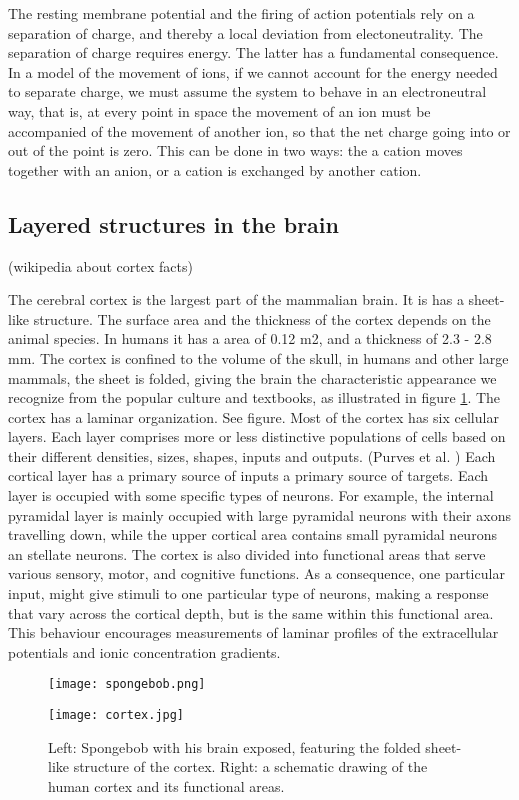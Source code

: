 \documentclass{article}
\begin{document}
The resting membrane potential and the firing of action potentials rely on a separation of charge, and thereby a local deviation from electoneutrality. The separation of charge requires energy. The latter has a fundamental consequence. In a model of the movement of ions, if we cannot account for the energy needed to separate charge, we must assume the system to behave in an electroneutral way, that is, at every point in space the movement of an ion must be accompanied of the movement of another ion, so that the net charge going into or out of the point is zero. This can be done in two ways: the a cation moves together with an anion, or a cation is exchanged by another cation. 

\subsection{Layered structures in the brain}
(wikipedia about cortex facts)
 
The cerebral cortex is the largest part of the mammalian brain. It is has a sheet-like structure. The surface area and the thickness of the cortex depends on the animal species. In humans it has a area of 0.12 m2, and a thickness of 2.3 - 2.8 mm. The cortex is confined to the volume of the skull, in humans and other large mammals, the sheet is folded, giving the brain the characteristic appearance we recognize from the popular culture and textbooks, as illustrated in figure  \ref{fig:spongebob}.  The cortex has a laminar organization. See figure. Most of the cortex has six cellular layers. Each layer comprises more or less distinctive populations of cells based on their different densities, sizes, shapes, inputs and outputs. (Purves et al. ) Each cortical layer has a primary source of inputs a primary source of targets. Each layer is occupied with some specific types of neurons. For example, the internal pyramidal layer is mainly occupied with large pyramidal neurons with their axons travelling down, while the upper cortical area contains small pyramidal neurons an stellate neurons. The cortex is also divided into functional areas that serve various sensory, motor, and cognitive functions. As a consequence, one particular input, might give stimuli to one particular type of neurons, making a response that vary across the cortical depth, but is the same within this functional area. This behaviour encourages measurements of laminar profiles of the extracellular potentials and ionic concentration gradients.  


\begin{figure}[!tbp]
  \centering
  \begin{minipage}[b]{0.45\textwidth}
    \texttt{[image: spongebob.png]}
  \end{minipage}
  \begin{minipage}[b]{0.45\textwidth}
    \texttt{[image: cortex.jpg]}
  \end{minipage}  
   \caption{Left: Spongebob with his brain exposed, featuring the folded sheet-like structure of the cortex. Right: a schematic drawing of the human cortex and its functional areas.}
  \label{fig:spongebob}
\end{figure}
\end{document}
